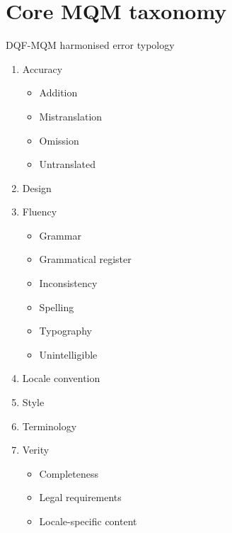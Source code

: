 \chapter{\label{appx:mqm}Core MQM taxonomy}

DQF-MQM harmonised error typology

\begin{enumerate}\compresslist{}
	\item Accuracy
	\begin{itemize}
		\item Addition
		\item Mistranslation
		\item Omission
		\item Untranslated
	\end{itemize}
	\item Design
	\item Fluency
	\begin{itemize}
		\item Grammar
		\item Grammatical register
		\item Inconsistency
		\item Spelling
		\item Typography
		\item Unintelligible
	\end{itemize}		
	\item Locale convention
	\item Style
	\item Terminology
	\item Verity
	\begin{itemize}
		\item Completeness
		\item Legal requirements
		\item Locale-specific content
	\end{itemize}
\end{enumerate}

